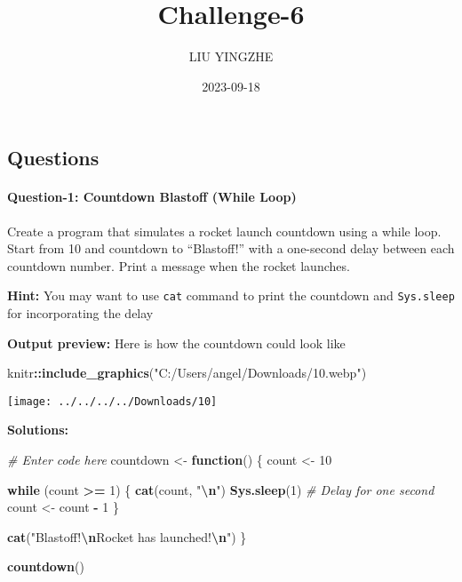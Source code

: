 \documentclass[
]{article}
\title{Challenge-6}
\author{LIU YINGZHE}
\date{2023-09-18}
\newenvironment{Shaded}{\begin{snugshade}}{\end{snugshade}}
\newcommand{\CommentTok}[1]{\textcolor[rgb]{0.56,0.35,0.01}{\textit{#1}}}
\newcommand{\ControlFlowTok}[1]{\textcolor[rgb]{0.13,0.29,0.53}{\textbf{#1}}}
\newcommand{\DecValTok}[1]{\textcolor[rgb]{0.00,0.00,0.81}{#1}}
\newcommand{\FunctionTok}[1]{\textcolor[rgb]{0.13,0.29,0.53}{\textbf{#1}}}
\newcommand{\NormalTok}[1]{#1}
\newcommand{\OtherTok}[1]{\textcolor[rgb]{0.56,0.35,0.01}{#1}}
\newcommand{\SpecialCharTok}[1]{\textcolor[rgb]{0.81,0.36,0.00}{\textbf{#1}}}
\newcommand{\StringTok}[1]{\textcolor[rgb]{0.31,0.60,0.02}{#1}}
\begin{document}
\maketitle

\hypertarget{questions}{%
\subsection{Questions}\label{questions}}

\hypertarget{question-1-countdown-blastoff-while-loop}{%
\paragraph{Question-1: Countdown Blastoff (While
Loop)}\label{question-1-countdown-blastoff-while-loop}}

Create a program that simulates a rocket launch countdown using a while
loop. Start from 10 and countdown to ``Blastoff!'' with a one-second
delay between each countdown number. Print a message when the rocket
launches.

\textbf{Hint:} You may want to use \texttt{cat} command to print the
countdown and \texttt{Sys.sleep} for incorporating the delay

\textbf{Output preview:} Here is how the countdown could look like

\begin{Shaded}
\begin{Highlighting}[]
\NormalTok{knitr}\SpecialCharTok{::}\FunctionTok{include\_graphics}\NormalTok{(}\StringTok{"C:/Users/angel/Downloads/10.webp"}\NormalTok{)}
\end{Highlighting}
\end{Shaded}

\texttt{[image: ../../../../Downloads/10]}

\textbf{Solutions:}

\begin{Shaded}
\begin{Highlighting}[]
\CommentTok{\# Enter code here}
\NormalTok{countdown }\OtherTok{\textless{}{-}} \ControlFlowTok{function}\NormalTok{() \{}
\NormalTok{  count }\OtherTok{\textless{}{-}} \DecValTok{10}
  
  \ControlFlowTok{while}\NormalTok{ (count }\SpecialCharTok{\textgreater{}=} \DecValTok{1}\NormalTok{) \{}
    \FunctionTok{cat}\NormalTok{(count, }\StringTok{"}\SpecialCharTok{\textbackslash{}n}\StringTok{"}\NormalTok{)}
    \FunctionTok{Sys.sleep}\NormalTok{(}\DecValTok{1}\NormalTok{)  }\CommentTok{\# Delay for one second}
\NormalTok{    count }\OtherTok{\textless{}{-}}\NormalTok{ count }\SpecialCharTok{{-}} \DecValTok{1}
\NormalTok{  \}}
  
  \FunctionTok{cat}\NormalTok{(}\StringTok{"Blastoff!}\SpecialCharTok{\textbackslash{}n}\StringTok{Rocket has launched!}\SpecialCharTok{\textbackslash{}n}\StringTok{"}\NormalTok{)}
\NormalTok{\}}

\FunctionTok{countdown}\NormalTok{()}
\end{Highlighting}
\end{Shaded}
\end{document}
